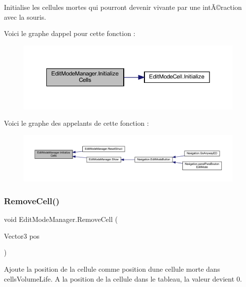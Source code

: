 Initialise les cellules mortes qui pourront devenir vivante par une intÃ©raction avec la souris. 

Voici le graphe d\textquotesingle{}appel pour cette fonction \+:
\nopagebreak
\begin{figure}[H]
\begin{center}
\leavevmode
\includegraphics[width=350pt]{class_edit_mode_manager_a8a950f58c809a7161d85e5d9a73e4d15_cgraph}
\end{center}
\end{figure}
Voici le graphe des appelants de cette fonction \+:
\nopagebreak
\begin{figure}[H]
\begin{center}
\leavevmode
\includegraphics[width=350pt]{class_edit_mode_manager_a8a950f58c809a7161d85e5d9a73e4d15_icgraph}
\end{center}
\end{figure}
\mbox{\label{class_edit_mode_manager_a8a8c1a3a9558fbbcfa7c15d8ce48a264}} 
\subsubsection{\texorpdfstring{Remove\+Cell()}{RemoveCell()}}
{\footnotesize\ttfamily void Edit\+Mode\+Manager.\+Remove\+Cell (\begin{DoxyParamCaption}\item[{Vector3}]{pos }\end{DoxyParamCaption})\hspace{0.3cm}{\ttfamily [inline]}}



Ajoute la position de la cellule comme position d\textquotesingle{}une cellule morte dans cells\+Volume\+Life. A la position de la cellule dans le tableau, la valeur devient 0. 


